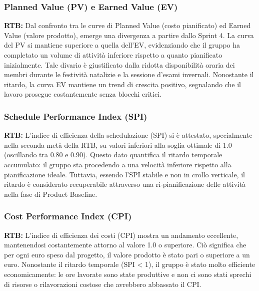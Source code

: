 \documentclass[11pt,a4paper]{article}
\begin{document}
\newpage
\subsubsection{Planned Value (PV) e Earned Value (EV)}

\textbf{RTB:} Dal confronto tra le curve di Planned Value (costo pianificato) ed Earned Value (valore prodotto), emerge una divergenza a partire dallo Sprint 4. La curva del PV si mantiene superiore a quella dell'EV, evidenziando che il gruppo ha completato un volume di attività inferiore rispetto a quanto pianificato inizialmente. Tale divario è giustificato dalla ridotta disponibilità oraria dei membri durante le festività natalizie e la sessione d'esami invernali. Nonostante il ritardo, la curva EV mantiene un trend di crescita positivo, segnalando che il lavoro prosegue costantemente senza blocchi critici.

\newpage
\subsubsection{Schedule Performance Index (SPI)}

\textbf{RTB:} L'indice di efficienza della schedulazione (SPI) si è attestato, specialmente nella seconda metà della RTB, su valori inferiori alla soglia ottimale di 1.0 (oscillando tra 0.80 e 0.90). Questo dato quantifica il ritardo temporale accumulato: il gruppo sta procedendo a una velocità inferiore rispetto alla pianificazione ideale. Tuttavia, essendo l'SPI stabile e non in crollo verticale, il ritardo è considerato recuperabile attraverso una ri-pianificazione delle attività nella fase di Product Baseline.

\newpage
\subsubsection{Cost Performance Index (CPI)}

\textbf{RTB:} L'indice di efficienza dei costi (CPI) mostra un andamento eccellente, mantenendosi costantemente attorno al valore 1.0 o superiore. Ciò significa che per ogni euro speso dal progetto, il valore prodotto è stato pari o superiore a un euro. Nonostante il ritardo temporale (SPI < 1), il gruppo è stato molto efficiente economicamente: le ore lavorate sono state produttive e non ci sono stati sprechi di risorse o rilavorazioni costose che avrebbero abbassato il CPI.
\end{document}

